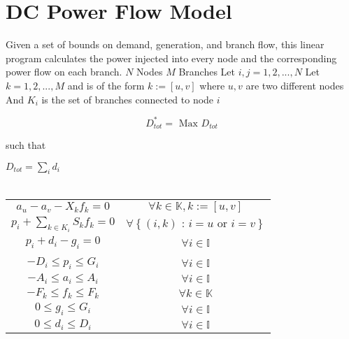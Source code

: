 \section{DC Power Flow Model}\label{dc flow}
Given a set of bounds on demand, generation, and branch flow, this linear program calculates the power injected into every node and the corresponding power flow on each branch. \newline
\newline
$N$ Nodes \newline
$M$ Branches \newline
\newline
Let $i,j = 1,2,...,N$  \newline
Let $k = 1,2,...,M$ and is of the form $k := [u,v]$ \newline
where $u,v$ are two different nodes \newline
And $K_i$ is the set of branches connected to node $i$ \newline

\begin{equation}\label{lp}
D_{tot}^* = \mbox{ Max } D_{tot} 
\end{equation}
\centerline{such that}


\begin{center}
$D_{tot} = \sum_i{d_i} $ \\
\mbox{ } \\
\begin{tabular}{cc}
  
$a_u - a_v - X_k f_k = 0 $ & $\forall k \in \mathbb{K}, k:=\left[ u, v \right]$  \\
$p_i + \sum_{k \in K_i } S_k f_k = 0 $ & $\forall \left\{ \left( i,k \right) \mbox{ : }  i=u \mbox{ or } i=v \right\} $\\
$p_i + d_i - g_i = 0$ & $\forall i \in \mathbb{I}$ \\
\\
$-D_i \leq p_i \leq G_i$ & $\forall i \in \mathbb{I}$ \\
$-A_i \leq a_i \leq  A_i $ & $\forall i \in \mathbb{I}$ \\
$-F_k \leq f_k \leq  F_k $ & $\forall k \in \mathbb{K}$ \\
$ 0 \leq g_i \leq G_i$ & $\forall i \in \mathbb{I}$ \\
$ 0 \leq d_i \leq D_i$ & $\forall i \in \mathbb{I}$ \\

\end{tabular}
\end{center}


